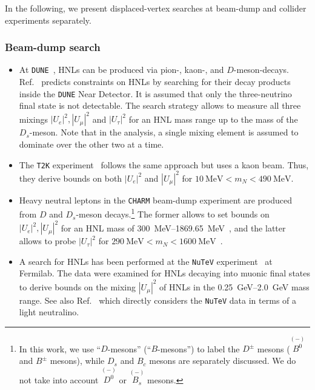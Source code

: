 In the following, we present displaced-vertex searches at beam-dump and collider 
experiments separately.



\subsubsection{Beam-dump search}
%
%
\begin{itemize} 
\item At \texttt{DUNE}~\cite{DUNE:2020lwj}, HNLs can be produced via pion-, kaon-, and  
$D$-meson-decays.
Ref.~\cite{Ballett:2019bgd} predicts constraints on HNLs by searching for their decay products inside the \texttt{DUNE} Near Detector.
It is assumed that only the three-neutrino final state is not detectable.
The search strategy allows to measure all three mixings $|U_e|^2, |U_\mu|^2$ and $|U_\tau|^2$ for an HNL mass range up to the mass of the $D_s$-meson.
Note that in the analysis, a single mixing element is assumed to dominate over the other two at a time.

\item The \texttt{T2K} experiment~\cite{T2K:2019jwa} follows the same approach but uses a kaon beam.
Thus, they derive bounds on both $|U_e|^2$ and $|U_\mu|^2$ for $\SI{10}{\MeV} < m_N < \SI{490}{\MeV}$.


\item Heavy neutral leptons in the \texttt{CHARM} beam-dump experiment are produced from $D$ and 
$D_s$-meson decays.\footnote{In this work, we use ``$D$-mesons'' (``$B$-mesons'') to label the $D^\pm$ 
mesons ($\overset{\scriptscriptstyle(-)}{B^0}$ and $B^\pm$ mesons), while $D_s$ and $B_c$ mesons are
separately discussed. We do not take into account $\overset{\scriptscriptstyle(-)}{D^0}$ or $\overset 
{\scriptscriptstyle(-)}{B_s}$ mesons.} The former allows to set bounds on $|U_e|^2, |U_\mu|^2$ 
for an HNL mass of \SIrange{300}{1869.65}{\MeV}~\cite{CHARM:1985nku,CHARMII:1994jjr}, and the latter 
allows to probe $|U_\tau|^2$ for $\SI{290}{\MeV} < m_N < \SI{1600}{\MeV}$~\cite{Orloff:2002de}.

\item A search for HNLs has been performed at the \texttt{NuTeV} experiment~\cite{NuTeV:1999kej} at 
Fermilab. The data were examined for HNLs decaying into muonic final states to derive bounds on the 
mixing $|U_\mu|^2$ of HNLs in the \SIrange{0.25}{2.0}{\GeV} mass range.
See also Ref.~\cite{Dedes:2001zia} which directly considers the \texttt{NuTeV} data in terms of a light neutralino.



\end{itemize}
